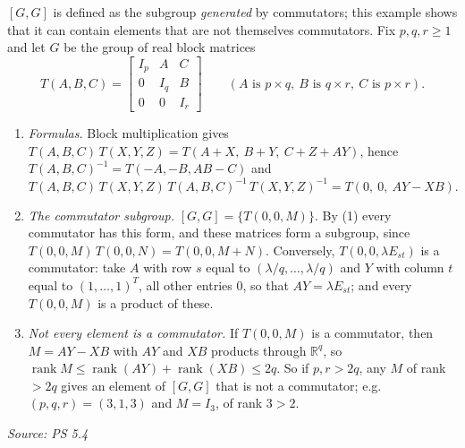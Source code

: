 \documentclass[11pt]{report}
\newcommand{\srcline}[1]{\par\hfill{\footnotesize\textit{Source: #1}}}
\begin{document}
\begin{exbox}\label{ex:products-commutators-not-commutators}
$[G,G]$ is defined as the subgroup \emph{generated} by commutators; this example shows that it can contain elements that are not themselves commutators. Fix $p, q, r \geq 1$ and let $G$ be the group of real block matrices
\[ T(A, B, C) = \begin{bmatrix} I_p & A & C \\ 0 & I_q & B \\ 0 & 0 & I_r \end{bmatrix} \qquad (A \text{ is } p \times q,\ B \text{ is } q \times r,\ C \text{ is } p \times r). \]
\begin{enumerate}
    \item \emph{Formulas.} Block multiplication gives $T(A, B, C)\,T(X, Y, Z) = T(A + X,\ B + Y,\ C + Z + AY)$, hence $T(A, B, C)^{-1} = T(-A, -B, AB - C)$ and
    \[ T(A, B, C)\,T(X, Y, Z)\,T(A, B, C)^{-1}\,T(X, Y, Z)^{-1} = T(0,\ 0,\ AY - XB). \]
    \item \emph{The commutator subgroup.} $[G, G] = \{T(0, 0, M)\}$. By (1) every commutator has this form, and these matrices form a subgroup, since $T(0,0,M)\,T(0,0,N) = T(0,0,M+N)$. Conversely, $T(0, 0, \lambda E_{st})$ is a commutator: take $A$ with row $s$ equal to $(\lambda/q, \ldots, \lambda/q)$ and $Y$ with column $t$ equal to $(1, \ldots, 1)^T$, all other entries $0$, so that $AY = \lambda E_{st}$; and every $T(0,0,M)$ is a product of these.
    \item \emph{Not every element is a commutator.} If $T(0, 0, M)$ is a commutator, then $M = AY - XB$ with $AY$ and $XB$ products through $\mathbb{R}^q$, so $\operatorname{rank} M \leq \operatorname{rank}(AY) + \operatorname{rank}(XB) \leq 2q$. So if $p, r > 2q$, any $M$ of rank $> 2q$ gives an element of $[G, G]$ that is not a commutator; e.g.\ $(p, q, r) = (3, 1, 3)$ and $M = I_3$, of rank $3 > 2$.
\end{enumerate}
\srcline{PS 5.4}
\end{exbox}
\end{document}
